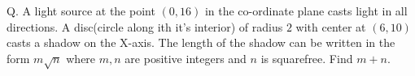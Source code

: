 Q. A light source at the point $(0, 16)$ in the co-ordinate plane casts light in all directions. A disc(circle along ith it's interior) of radius $2$ with center at $(6, 10)$ casts a shadow on the X-axis. The length of the shadow can be written in the form $m\sqrt{n}$ where $m, n$ are positive integers and $n$ is squarefree. Find $m + n$.

